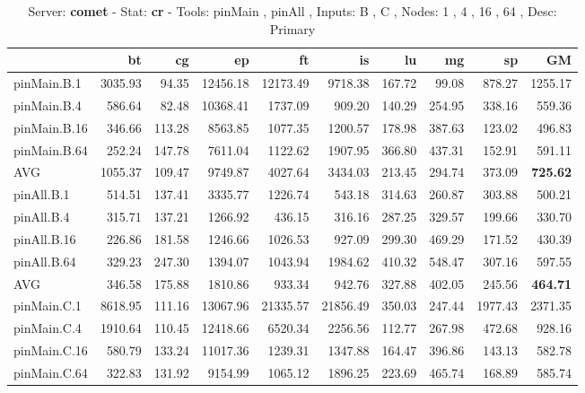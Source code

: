 \begin{table*}[]
\caption{Server: \textbf{comet} - 
 Stat: \textbf{cr} - 
 Tools: pinMain , pinAll ,  
 Inputs: B , C ,  
 Nodes: 1 , 4 , 16 , 64 ,  
 Desc: Primary}
\label{comet_cr_pMpA_BC_itn_p3.5}\begin{center}
\begin{tabular}{|l|rrrrrrrr|r|}
\hline
              &      bt &     cg &       ep &       ft &       is &     lu &     mg &      sp &      GM \\
\hline
 pinMain.B.1  & 3035.93 &  94.35 & 12456.18 & 12173.49 &  9718.38 & 167.72 &  99.08 &  878.27 & 1255.17 \\
 pinMain.B.4  &  586.64 &  82.48 & 10368.41 &  1737.09 &   909.20 & 140.29 & 254.95 &  338.16 &  559.36 \\
 pinMain.B.16 &  346.66 & 113.28 &  8563.85 &  1077.35 &  1200.57 & 178.98 & 387.63 &  123.02 &  496.83 \\
 pinMain.B.64 &  252.24 & 147.78 &  7611.04 &  1122.62 &  1907.95 & 366.80 & 437.31 &  152.91 &  591.11 \\
 \hline
 AVG          & 1055.37 & 109.47 &  9749.87 &  4027.64 &  3434.03 & 213.45 & 294.74 &  373.09 &  \textbf{725.62} \\
 \hline
 pinAll.B.1   &  514.51 & 137.41 &  3335.77 &  1226.74 &   543.18 & 314.63 & 260.87 &  303.88 &  500.21 \\
 pinAll.B.4   &  315.71 & 137.21 &  1266.92 &   436.15 &   316.16 & 287.25 & 329.57 &  199.66 &  330.70 \\
 pinAll.B.16  &  226.86 & 181.58 &  1246.66 &  1026.53 &   927.09 & 299.30 & 469.29 &  171.52 &  430.39 \\
 pinAll.B.64  &  329.23 & 247.30 &  1394.07 &  1043.94 &  1984.62 & 410.32 & 548.47 &  307.16 &  597.55 \\
 \hline
 AVG          &  346.58 & 175.88 &  1810.86 &   933.34 &   942.76 & 327.88 & 402.05 &  245.56 &  \textbf{464.71} \\
 \hline
 \hline
 pinMain.C.1  & 8618.95 & 111.16 & 13067.96 & 21335.57 & 21856.49 & 350.03 & 247.44 & 1977.43 & 2371.35 \\
 pinMain.C.4  & 1910.64 & 110.45 & 12418.66 &  6520.34 &  2256.56 & 112.77 & 267.98 &  472.68 &  928.16 \\
 pinMain.C.16 &  580.79 & 133.24 & 11017.36 &  1239.31 &  1347.88 & 164.47 & 396.86 &  143.13 &  582.78 \\
 pinMain.C.64 &  322.83 & 131.92 &  9154.99 &  1065.12 &  1896.25 & 223.69 & 465.74 &  168.89 &  585.74 \\

\end{tabular}
\end{center}
\end{table*}
